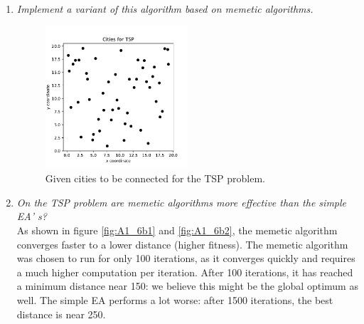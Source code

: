 \documentclass{article}
\begin{document}
\begin{enumerate}[label=\alph*)]
    \item \textit{Implement a variant of this algorithm based on memetic algorithms.} \\
    
    \begin{figure}[H]
        \centering
        \includegraphics[width=0.5\textwidth]{Assignment 1/Figures/A1_6a.pdf}
        \caption{Given cities to be connected for the TSP problem.}
        \label{fig:A1_6a}
    \end{figure}

    \item \textit{On the TSP problem are memetic algorithms more effective than the simple EA’ s? } \\
    As shown in figure \ref{fig:A1_6b1} and \ref{fig:A1_6b2}, the memetic algorithm converges faster to a lower distance (higher fitness). The memetic algorithm was chosen to run for only 100 iterations, as it converges quickly and requires a much higher computation per iteration. After 100 iterations, it has reached a minimum distance near 150: we believe this might be the global optimum as well. The simple EA performs a lot worse: after 1500 iterations, the best distance is near 250. 
    

\end{enumerate}
\end{document}
